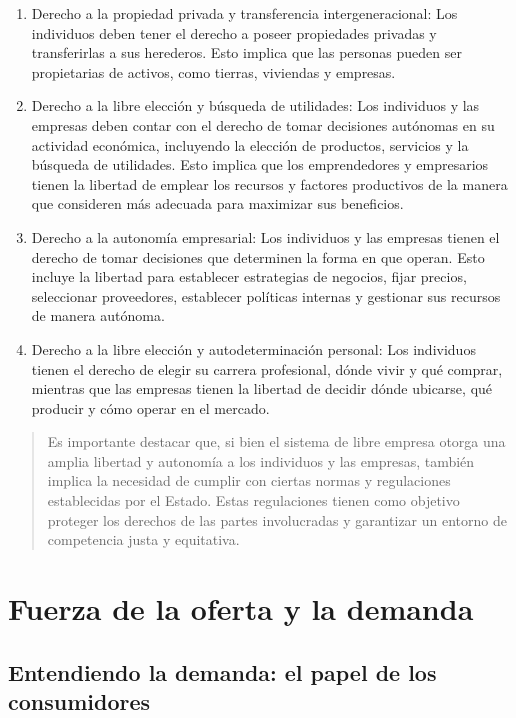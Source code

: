 \documentclass[
  letterpaper,
  DIV=11,
  numbers=noendperiod]{scrartcl}
\begin{document}
\begin{enumerate}
\def\labelenumi{\arabic{enumi}.}
\item
  Derecho a la propiedad privada y transferencia intergeneracional: Los
  individuos deben tener el derecho a poseer propiedades privadas y
  transferirlas a sus herederos. Esto implica que las personas pueden
  ser propietarias de activos, como tierras, viviendas y empresas.
\item
  Derecho a la libre elección y búsqueda de utilidades: Los individuos y
  las empresas deben contar con el derecho de tomar decisiones autónomas
  en su actividad económica, incluyendo la elección de productos,
  servicios y la búsqueda de utilidades. Esto implica que los
  emprendedores y empresarios tienen la libertad de emplear los recursos
  y factores productivos de la manera que consideren más adecuada para
  maximizar sus beneficios.
\item
  Derecho a la autonomía empresarial: Los individuos y las empresas
  tienen el derecho de tomar decisiones que determinen la forma en que
  operan. Esto incluye la libertad para establecer estrategias de
  negocios, fijar precios, seleccionar proveedores, establecer políticas
  internas y gestionar sus recursos de manera autónoma.
\item
  Derecho a la libre elección y autodeterminación personal: Los
  individuos tienen el derecho de elegir su carrera profesional, dónde
  vivir y qué comprar, mientras que las empresas tienen la libertad de
  decidir dónde ubicarse, qué producir y cómo operar en el mercado.
\end{enumerate}

\begin{quote}
Es importante destacar que, si bien el sistema de libre empresa otorga
una amplia libertad y autonomía a los individuos y las empresas, también
implica la necesidad de cumplir con ciertas normas y regulaciones
establecidas por el Estado. Estas regulaciones tienen como objetivo
proteger los derechos de las partes involucradas y garantizar un entorno
de competencia justa y equitativa.
\end{quote}

\hypertarget{fuerza-de-la-oferta-y-la-demanda}{%
\section{Fuerza de la oferta y la
demanda}\label{fuerza-de-la-oferta-y-la-demanda}}

\hypertarget{entendiendo-la-demanda-el-papel-de-los-consumidores}{%
\subsection{Entendiendo la demanda: el papel de los
consumidores}\label{entendiendo-la-demanda-el-papel-de-los-consumidores}}
\end{document}

